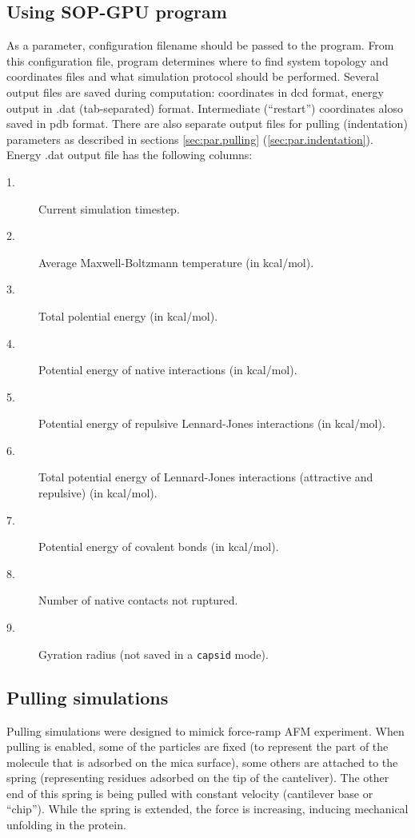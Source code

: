 \documentclass[a4paper]{article}
\begin{document}
\subsection{Using SOP-GPU program}
As a parameter, configuration filename should be passed to the program. From this configuration file, program determines where to find system topology and coordinates files and what simulation protocol should be performed. Several output files are saved during computation: coordinates in dcd format, energy output in .dat (tab-separated) format. Intermediate (``restart'') coordinates aloso saved in pdb format. There are also separate output files for pulling (indentation) parameters as described in sections \ref{sec:par.pulling} (\ref{sec:par.indentation}). Energy .dat output file has the following columns:

\begin{description}
\item[1.] Current simulation timestep.
\item[2.] Average Maxwell-Boltzmann temperature (in kcal/mol).
\item[3.] Total polential energy (in kcal/mol).
\item[4.] Potential energy of native interactions (in kcal/mol).
\item[5.] Potential energy of repulsive Lennard-Jones interactions (in kcal/mol).
\item[6.] Total potential energy of Lennard-Jones interactions (attractive and repulsive) (in kcal/mol).
\item[7.] Potential energy of covalent bonds (in kcal/mol).
\item[8.] Number of native contacts not ruptured.
\item[9.] Gyration radius (not saved in a \texttt{capsid} mode).
\end{description}
 
\subsection{Pulling simulations}

Pulling simulations were designed to mimick force-ramp AFM experiment. When pulling is enabled, some of the particles are fixed (to represent the part of the molecule that is adsorbed on the mica surface), some others are attached to the spring (representing residues adsorbed on the tip of the canteliver). The other end of this spring is being pulled with constant velocity (cantilever base or ``chip''). While the spring is extended, the force is increasing, inducing mechanical unfolding in the protein.
\end{document}
